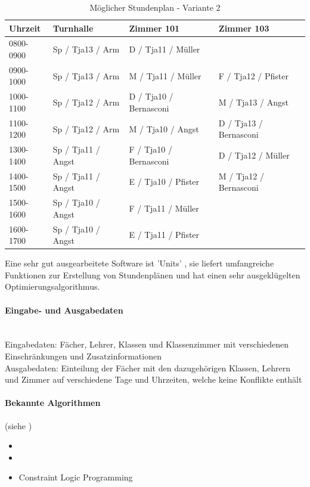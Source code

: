 \begin{table}[ht]
\centering
  \begin{tabular}{ l | l | l | l }
	\hline
	\rowcolor{gray}
	\textbf{Uhrzeit} 	& \textbf{Turnhalle}	& \textbf{Zimmer 101} 	& \textbf{Zimmer 103}	\\ \hline
	0800-0900		& Sp / Tja13 / Arm		& D / Tja11 / Müller		& 				\\ \hline
	0900-1000		& Sp / Tja13 / Arm		& M / Tja11 / Müller		& F / Tja12 / Pfister		\\ \hline
	1000-1100		& Sp / Tja12 / Arm		& D / Tja10 / Bernasconi	& M / Tja13 / Angst		\\ \hline
	1100-1200		& Sp / Tja12 / Arm		& M / Tja10 / Angst		& D / Tja13 / Bernasconi	\\ \hline \hline
	1300-1400		& Sp / Tja11 / Angst	& F / Tja10 / Bernasconi	& D / Tja12 / Müller		\\ \hline
	1400-1500		& Sp / Tja11 / Angst	& E / Tja10 / Pfister		& M / Tja12 / Bernasconi	\\ \hline
	1500-1600		& Sp / Tja10 / Angst	& F / Tja11 / Müller		& 				\\ \hline
	1600-1700		& Sp / Tja10 / Angst	& E / Tja11 / Pfister		& 				\\ \hline
  \end{tabular}
   \caption{Möglicher Stundenplan - Variante 2}\label{table:timetable_2}
\end{table}

\FloatBarrier
	Eine sehr gut ausgearbeitete Software ist 'Units' \cite{unit_express}, sie liefert umfangreiche Funktionen zur Erstellung von Stundenplänen und hat einen sehr ausgeklügelten Optimierungsalgorithmus.

	\paragraph{Eingabe- und Ausgabedaten}\mbox{}\\
	Eingabedaten: Fächer, Lehrer, Klassen und Klassenzimmer mit verschiedenen Einschränkungen und Zusatzinformationen\\
	Ausgabedaten: Einteilung der Fächer mit den dazugehörigen Klassen, Lehrern und Zimmer auf verschiedene Tage und Uhrzeiten, welche keine Konflikte enthält

	\paragraph{Bekannte Algorithmen}
	(siehe \cite{framework_timetabling})
	\begin{itemize}
		\item {}
		\item {}
		\item Constraint Logic Programming
	\end{itemize}	

